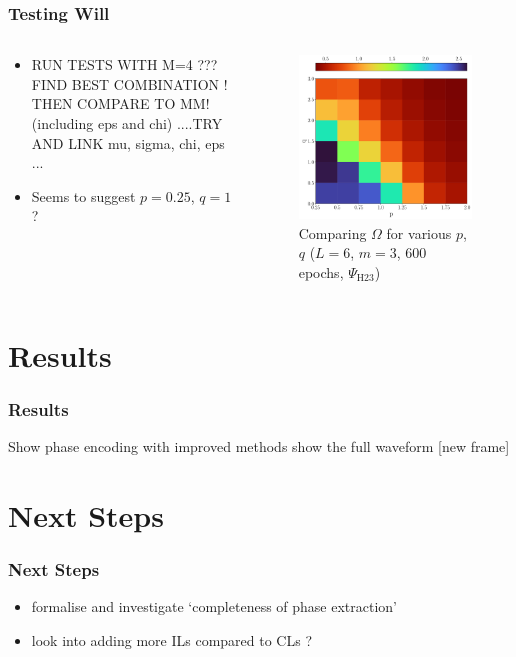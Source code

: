 \documentclass{beamer}
\begin{document}
\begin{frame}
\frametitle{Testing Will}
\begin{columns}
\begin{column}{0.5\textwidth}
\begin{itemize}
\item RUN TESTS WITH M=4 ??? FIND BEST COMBINATION ! THEN COMPARE TO MM! (including eps and chi) ....TRY AND LINK mu, sigma, chi, eps ... 
\item Seems to suggest $p=0.25$, $q=1$ ? 
\end{itemize}
\end{column}
\begin{column}{0.5\textwidth}
\begin{figure}
\centering 
\includegraphics[width=\textwidth]{im/omega_3_6_600}
\caption{Comparing $\Omega$ for various $p$, $q$ ($L=6$, $m=3$, 600 epochs, $\Psi_\text{H23}$)}
\end{figure}
\end{column}
\end{columns}
\end{frame}


\section{Results}

\begin{frame}
\frametitle{Results}
Show phase encoding with improved methods 
show the full waveform [new frame]
\end{frame}

\section{Next Steps}

\begin{frame}
\frametitle{Next Steps}
\begin{itemize}
\item formalise and investigate `completeness of phase extraction' 
\item look into adding more ILs compared to CLs ?
\end{itemize}
\end{frame}
\end{document}
